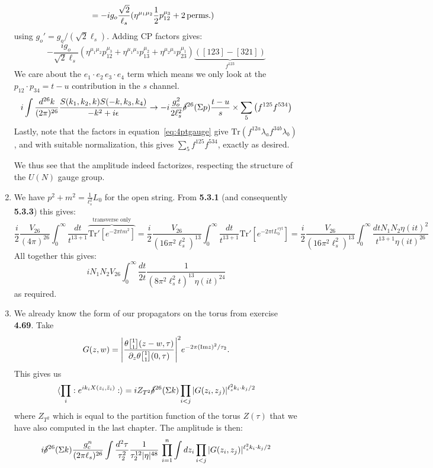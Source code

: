 \documentclass[11pt, class=article, crop=false]{standalone}
\begin{document}
\begin{enumerate}
\[\begin{aligned}
		&= -i g_o \frac{\sqrt 2}{\ell_s} (\eta^{\mu_1 \mu_2}\frac12 p_{12}^{\mu_3} + 2 \,\mathrm{perms.}) 
	\end{aligned}
	\]
	using $g_o' = g_o/(\sqrt 2 \ell_s)$. Adding CP factors gives:
	\[
		-\frac{i g_o}{\sqrt 2 \ell_s} (\eta^{\mu_1 \mu_2} p_{12}^{\mu_3} + \eta^{\mu_1 \mu_3} p_{13}^{\mu_2} + \eta^{\mu_2 \mu_3} p_{23}^{\mu_1}) \underbrace{([123] - [321])}_{f^{123}}
	\]
	We care about the $e_1 \cdot e_2 \, e_3 \cdot e_4$ term which means we only look at the $p_{12} \cdot p_{34} = t - u$ contribution in the $s$ channel.
	\[
		i \int \frac{d^{26}k}{(2\pi)^{26}} \frac{S(k_1, k_2, k) S(-k, k_3, k_4)}{-k^2 + i \epsilon} \to - i \frac{g_o^2}{2 \ell_s^2} \cancel\delta^{26}(\Sigma p) \frac{t-u}{s} \times \sum_{5} \left( f^{125} f^{534} \right)
	\]
	Lastly, note that the factors in equation~\eqref{eq:4ptgauge} give $\mathrm{Tr}(f^{12a} \lambda_a f^{34b} \lambda_b)$, and with suitable normalization, this gives $\sum_5 f^{125} f^{534}$, exactly as desired. 
	
	We thus see that the amplitude indeed factorizes, respecting the structure of the $U(N)$ gauge group. 
	
	\item We have $p^2 + m^2 = \frac{1}{\ell_s^2} L_0$ for the open string. From \textbf{5.3.1} (and consequently \textbf{5.3.3}) this gives:
	\[
		\frac{i}{2} \frac{V_{26}}{(4\pi)^{26}} \int_0^\infty \frac{dt}{t^{13+1}} \overbrace{\mathrm{Tr'}[e^{-2\pi t m^2}]}^{\text{transverse only}} = \frac{i}{2} \frac{V_{26}}{(16\pi^2 \ell_s^2)^{13}} \int_0^\infty \frac{dt}{t^{13+1}} \mathrm{Tr'}[e^{-2\pi t L_0^{\text{cyl}}}] =  \frac{i}{2} \frac{V_{26}}{(16\pi^2 \ell_s^2)^{13}} \int_0^\infty \frac{dt N_1 N_2 \eta(i t)^2}{t^{13+1} \eta(i t)^{26}} 
	\]
	All together this gives:
	\[
		i N_1 N_2 V_{26} \int_0^\infty \frac{dt}{2 t} \frac{1}{(8 \pi^2 \ell_s^2 t)^{13} \eta(it)^{24}}
	\]
	as required.
	\item We already know the form of our propagators on the torus from exercise \textbf{4.69}. Take 
	\[
		G(z, w)= \Bigg|\frac{\theta\twist11 (z-w, \tau)}{\d_z \theta \twist11 (0, \tau)} \Bigg|^2 e^{-2 \pi (\mathrm{Im} z)^2 / \tau_2}.
	\]
	This gives us
	\[
		\braket{\prod_{i} :e^{i k_i X(z_i, \bar z_i)}:}  = i Z_{T^2} \cancel\delta^{26} (\Sigma k) \prod_{i < j} |G(z_i, z_j)|^{\ell_s^2 k_i \cdot k_j/2}
	\]
	where $Z_{T^2}$ which is equal to the partition function of the torus $Z(\tau)$ that we have also computed in the last chapter. The amplitude is then:
	\[
		i \cancel\delta^{26} (\Sigma k) \frac{g_c^n}{(2 \pi \ell_s)^{26}}  \int \frac{d^2 \tau}{\tau_2^2} \frac{1}{\tau_2^{12} |\eta|^{48}}\,  \prod_{i=1}^n \int dz_i  \prod_{i < j} |G(z_i, z_j)|^{\ell_s^2 k_i \cdot k_j/2}
	\]
	

\end{enumerate}
\end{document}
